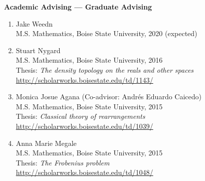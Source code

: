 \documentclass[12pt]{article}
\begin{document}
\textbf{Academic Advising --- Graduate Advising}
\begin{enumerate}[revarabic]

\item Jake Weedn \\
M.S. Mathematics, Boise State University, 2020 (expected)

\item
Stuart Nygard \\
M.S. Mathematics, Boise State University, 2016 \\
Thesis: \emph{The density topology on the reals and other spaces} \\
\url{http://scholarworks.boisestate.edu/td/1143/}

\item Monica Josue Agana (Co-advisor: Andr\'es Eduardo Caicedo) \\
M.S. Mathematics, Boise State University, 2015 \\
Thesis: \emph{Classical theory of rearrangements} \\
\url{http://scholarworks.boisestate.edu/td/1039/}

\item Anna Marie Megale \\
M.S. Mathematics, Boise State University, 2015 \\
Thesis: \emph{The Frobenius problem} \\
\url{http://scholarworks.boisestate.edu/td/1048/}


\end{enumerate}
\end{document}
